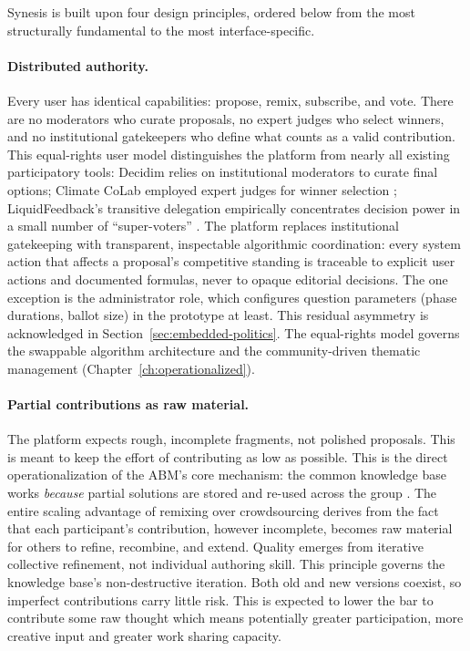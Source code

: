 \documentclass[a4paper, 12pt, twoside]{iviathesis}
\begin{document}
Synesis is built upon four design principles, ordered below from the most structurally fundamental to the most interface-specific.

\paragraph{Distributed authority.}
\label{sec:distributed-authority}
Every user has identical capabilities: propose, remix, subscribe, and vote. There are no moderators who curate proposals, no expert judges who select winners, and no institutional gatekeepers who define what counts as a valid contribution. This equal-rights user model distinguishes the platform from nearly all existing participatory tools: Decidim relies on institutional moderators to curate final options; Climate CoLab employed expert judges for winner selection \cite{malone2017contest}; LiquidFeedback's transitive delegation empirically concentrates decision power in a small number of ``super-voters'' \cite{kling2015liquidfeedback}. The platform replaces institutional gatekeeping with transparent, inspectable algorithmic coordination: every system action that affects a proposal's competitive standing is traceable to explicit user actions and documented formulas, never to opaque editorial decisions. The one exception is the administrator role, which configures question parameters (phase durations, ballot size) in the prototype at least. This residual asymmetry is acknowledged in Section~\ref{sec:embedded-politics}. The equal-rights model governs the swappable algorithm architecture and the community-driven thematic management (Chapter~\ref{ch:operationalized}).

\paragraph{Partial contributions as raw material.}
\label{sec:partial-contributions}
The platform expects rough, incomplete fragments, not polished proposals. This is meant to keep the effort of contributing as low as possible. This is the direct operationalization of the ABM's core mechanism: the common knowledge base works \textit{because} partial solutions are stored and re-used across the group \cite{carpentras_empowering_2024}. The entire scaling advantage of remixing over crowdsourcing derives from the fact that each participant's contribution, however incomplete, becomes raw material for others to refine, recombine, and extend. Quality emerges from iterative collective refinement, not individual authoring skill. This principle governs the knowledge base's non-destructive iteration. Both old and new versions coexist, so imperfect contributions carry little risk. This is expected to lower the bar to contribute some raw thought which means potentially greater participation, more creative input and greater work sharing capacity.
\end{document}
